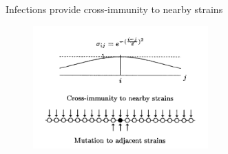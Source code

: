 \documentclass{beamer}
\begin{document}
%                 
%         
%         
\begin{frame}{Infections provide cross-immunity to nearby strains}
        \centering
            \begin{figure}
                \includegraphics[width=0.6\textwidth]{standalone/gog_fig.png}
            \end{figure}
    \centering
    \vfill
    \tiny{\cite{gogDynamicsSelectionManystrain2002}}
\end{frame}
\end{document}
